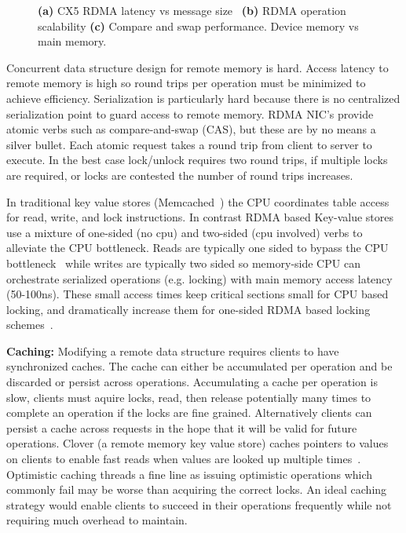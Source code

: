 \begin{figure}[t]
\begin{subfigure}{0.3\linewidth}
    \end{subfigure}
    \vspace{-1em}
    \caption{
    \textbf{(a)} CX5 RDMA latency vs message size~\cite{rdma-latency}
    \textbf{(b)} RDMA operation scalability
    \textbf{(c)} Compare and swap performance. Device memory vs main memory.
    }
    \label{fig:rdma-benchmarks}
\end{figure}

Concurrent data structure design for remote memory is hard.
Access latency to remote memory is high so round trips per
operation must be minimized to achieve efficiency.
Serialization is particularly hard because there is no
centralized serialization point to guard access to remote
memory. RDMA NIC's provide atomic verbs such as
compare-and-swap (CAS), but these are by no means a silver
bullet.  Each atomic request takes a round trip from client
to server to execute. In the best case lock/unlock requires
two round trips, if multiple locks are required, or locks
are contested the number of round trips increases.

In traditional key value stores (Memcached~\cite{memcached})
the CPU coordinates table access for read, write, and lock
instructions. In contrast RDMA based Key-value
stores~\cite{herd,erpc,pilaf} use a mixture of one-sided (no
cpu) and two-sided (cpu involved) verbs to alleviate the CPU
bottleneck. Reads are typically one sided to bypass the CPU
bottleneck~\cite{pilaf,cell} while writes are typically two
sided so memory-side CPU can orchestrate serialized
operations (e.g. locking) with main memory access latency
(50-100ns).  These small access times keep critical sections
small for CPU based locking, and dramatically increase them
for one-sided RDMA based locking schemes~\cite{clover,
sherman}.

\textbf{Caching:} Modifying a remote data structure requires
clients to have synchronized caches. The cache can either be
accumulated per operation and be discarded or persist across
operations.  Accumulating a cache per operation is slow,
clients must aquire locks, read, then release potentially
many times to complete an operation if the locks are fine
grained. Alternatively clients can persist a cache across
requests in the hope that it will be valid for future
operations.  Clover (a remote memory key value store) caches
pointers to values on clients to enable fast reads when
values are looked up multiple times~\cite{clover}.
Optimistic caching threads a fine line as issuing optimistic
operations which commonly fail may be worse than acquiring
the correct locks.  An ideal caching strategy would enable
clients to succeed in their operations frequently while not
requiring much overhead to maintain. 



